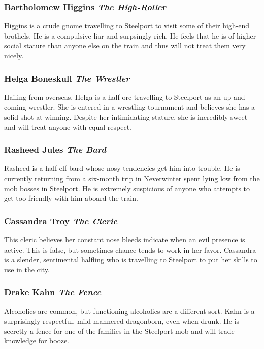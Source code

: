 \documentclass[letterpaper,10pt,twoside,twocolumn,openany]{dndbook}
\begin{document}
\subsubsection{Bartholomew Higgins \textit{The High-Roller}}
Higgins is a crude gnome travelling to Steelport to visit some of their high-end brothels.  He is a compulsive liar and surpsingly rich.  He feels that he is of higher social stature than anyone else on the train and thus will not treat them very nicely.

\subsubsection{Helga Boneskull \textit{The Wrestler}}
Hailing from overseas, Helga is a half-orc travelling to Steelport as an up-and-coming wrestler.  She is entered in a wrestling tournament and believes she has a solid shot at winning. Despite her intimidating stature, she is incredibly sweet and will treat anyone with equal respect.

\subsubsection{Rasheed Jules \textit{The Bard}}
Rasheed is a half-elf bard whose nosy tendencies get him into trouble.  He is currently returning from a six-month trip in Neverwinter spent lying low from the mob bosses in Steelport.  He is extremely suspicious of anyone who attempts to get too friendly with him aboard the train.

\subsubsection{Cassandra Troy \textit{The Cleric}}
This cleric believes her constant nose bleeds indicate when an evil presence is active. This is false, but sometimes chance tends to work in her favor. Cassandra is a slender, sentimental halfling who is travelling to Steelport to put her skills to use in the city.
 
\subsubsection{Drake Kahn \textit{The Fence}}
Alcoholics are common, but functioning alcoholics are a different sort.  Kahn is a surprisingly respectful, mild-mannered dragonborn, even when drunk.  He is secretly a fence for one of the families in the Steelport mob and will trade knowledge for booze.
\end{document}
